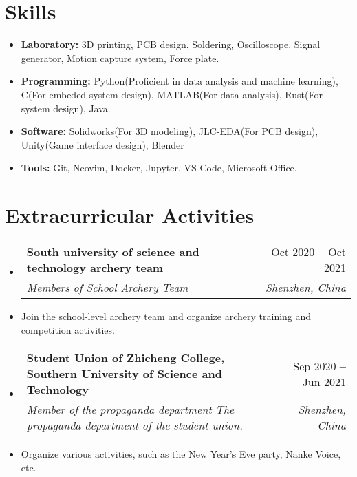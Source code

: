 \documentclass[letterpaper,11pt]{article}
\makeatletter
\newcommand{\resumeItem}[1]{
  \item\small{
    {#1 \vspace{-2pt}}
  }
}
\newcommand{\resumeSubheading}[4]{
  \vspace{-2pt}\item
    \begin{tabular*}{0.97\textwidth}[t]{l@{\extracolsep{\fill}}r}
      \textbf{#1} & #2 \\
      \textit{\small#3} & \textit{\small #4} \\
    \end{tabular*}\vspace{-7pt}
}
\newcommand{\resumeSubHeadingListStart}{\begin{itemize}[leftmargin=0.15in, label={}]}
\newcommand{\resumeSubHeadingListEnd}{\end{itemize}}
\newcommand{\resumeItemListStart}{\begin{itemize}}
\newcommand{\resumeItemListEnd}{\end{itemize}\vspace{-5pt}}
\makeatother
\begin{document}
%
%
%

\section{Skills}
\resumeItemListStart
\resumeItem{\textbf{Laboratory:}
  3D printing, PCB design, Soldering, Oscilloscope, Signal generator, Motion capture system, Force plate.}
\resumeItem{\textbf{Programming:}
  Python(Proficient in data analysis and machine learning), C(For embeded system design), MATLAB(For
  data analysis), Rust(For system design), Java.
} \resumeItem{\textbf{Software:}
  Solidworks(For 3D modeling), JLC-EDA(For PCB design), Unity(Game interface design), Blender}
\resumeItem{\textbf{Tools:} Git, Neovim, Docker, Jupyter, VS Code, Microsoft Office.
}
\resumeItemListEnd

\section{Extracurricular Activities} \vspace{3pt}
\resumeSubHeadingListStart \resumeSubheading {South university of science and technology archery
  team}{Oct 2020 \textbf{--}
  Oct 2021} {Members of School Archery Team}{Shenzhen, China} \resumeItem{Join the school-level
  archery team and organize archery training and competition activities.
}

\resumeSubheading
{Student Union of Zhicheng College, Southern University of Science and Technology}{Sep 2020 \textbf{--}
  Jun 2021} {Member of the propaganda department The propaganda department of the student union.
}{Shenzhen, China}
\resumeItem{Organize various activities, such as the New Year's Eve party, Nanke Voice, etc.}
\resumeSubHeadingListEnd
\end{document}
